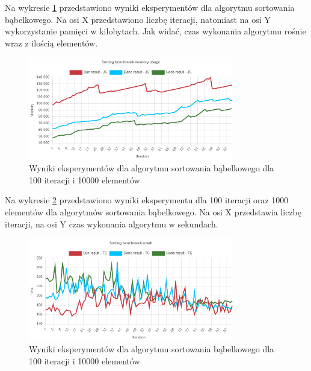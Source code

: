 Na wykresie \ref{fig:bubble_sorting_e5_memory_js} przedstawiono wyniki eksperymentów dla algorytmu sortowania bąbelkowego. Na osi X przedstawiono liczbę iteracji, natomiast na osi Y wykorzystanie pamięci w kilobytach. Jak widać, czas wykonania algorytmu rośnie wraz z ilością elementów.
\begin{figure}[H]
  \centering
  \includegraphics[width=0.8\textwidth]{Figures/sorting/bubble/e5_memory_js.png}
  \caption{Wyniki eksperymentów dla algorytmu sortowania bąbelkowego dla 100 iteracji i 10000 elementów}
  \label{fig:bubble_sorting_e5_memory_js}
\end{figure}

Na wykresie \ref{fig:bubble_sorting_e5_ts} przedstawiono wyniki eksperymentu dla 100 iteracji oraz 1000 elementów dla algorytmów sortowania bąbelkowego. Na osi X przedstawia liczbę iteracji, na osi Y czas wykonania algorytmu w sekundach. 

\begin{figure}[H]
  \centering
  \includegraphics[width=0.8\textwidth]{Figures/sorting/bubble/e5_ts.png}
  \caption{Wyniki eksperymentów dla algorytmu sortowania bąbelkowego dla 100 iteracji i 10000 elementów}
  \label{fig:bubble_sorting_e5_ts}
\end{figure}

